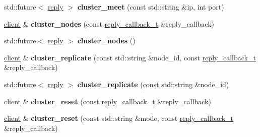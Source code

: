 \begin{DoxyCompactItemize}
\item 
\mbox{\label{classcpp__redis_1_1client_af142b166d5f88f76f5fd46e6e33c0523}} 
std\+::future$<$ \hyperlink{classcpp__redis_1_1reply}{reply} $>$ {\bfseries cluster\+\_\+meet} (const std\+::string \&ip, int port)
\item 
\mbox{\label{classcpp__redis_1_1client_a1e4cc880ce249fcad1b1f6ddd15f515f}} 
\hyperlink{classcpp__redis_1_1client}{client} \& {\bfseries cluster\+\_\+nodes} (const \hyperlink{classcpp__redis_1_1client_a061a1140d36d2eaeda82b09a0bb3f9f2}{reply\+\_\+callback\+\_\+t} \&reply\+\_\+callback)
\item 
\mbox{\label{classcpp__redis_1_1client_a6e777dc7b54ecb4aff3e1c281f92dd81}} 
std\+::future$<$ \hyperlink{classcpp__redis_1_1reply}{reply} $>$ {\bfseries cluster\+\_\+nodes} ()
\item 
\mbox{\label{classcpp__redis_1_1client_a65688223390e47c0400ba4a128000f89}} 
\hyperlink{classcpp__redis_1_1client}{client} \& {\bfseries cluster\+\_\+replicate} (const std\+::string \&node\+\_\+id, const \hyperlink{classcpp__redis_1_1client_a061a1140d36d2eaeda82b09a0bb3f9f2}{reply\+\_\+callback\+\_\+t} \&reply\+\_\+callback)
\item 
\mbox{\label{classcpp__redis_1_1client_a4ce5b739522aefd5ca7c8aef8c76cc61}} 
std\+::future$<$ \hyperlink{classcpp__redis_1_1reply}{reply} $>$ {\bfseries cluster\+\_\+replicate} (const std\+::string \&node\+\_\+id)
\item 
\mbox{\label{classcpp__redis_1_1client_a99c86f1931c92594f2c14ac34b3d5dfd}} 
\hyperlink{classcpp__redis_1_1client}{client} \& {\bfseries cluster\+\_\+reset} (const \hyperlink{classcpp__redis_1_1client_a061a1140d36d2eaeda82b09a0bb3f9f2}{reply\+\_\+callback\+\_\+t} \&reply\+\_\+callback)
\item 
\mbox{\label{classcpp__redis_1_1client_a3f039634232d14d4eec6fea27784a347}} 
\hyperlink{classcpp__redis_1_1client}{client} \& {\bfseries cluster\+\_\+reset} (const std\+::string \&mode, const \hyperlink{classcpp__redis_1_1client_a061a1140d36d2eaeda82b09a0bb3f9f2}{reply\+\_\+callback\+\_\+t} \&reply\+\_\+callback)

\end{DoxyCompactItemize}
